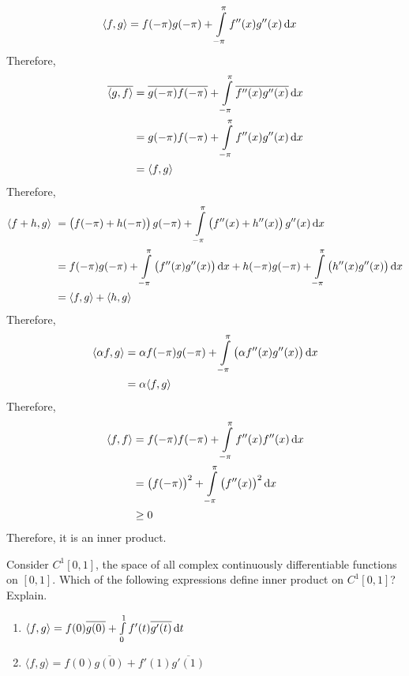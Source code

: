 \documentclass[fleqn, a4paper, 11pt, oneside]{amsart}
\theoremstyle{definition}
\theoremstyle{theorem}
\begin{document}
\begin{solution}
	\begin{align*}
		\langle f,g \rangle & = f(-\pi) g(-\pi) + \int\limits_{-\pi}^{\pi} f''(x) g''(x) \dif x
	\end{align*}
	Therefore,
	\begin{align*}
		\overline{\langle g,f \rangle} & = \overline{g(-\pi) f(-\pi)} + \int\limits_{-\pi}^{\pi} \overline{f''(x) g''(x)} \dif x \\
                                               & = g(-\pi) f(-\pi) + \int\limits_{-\pi}^{\pi} f''(x) g''(x) \dif x                       \\
                                               & = \langle f,g \rangle
	\end{align*}
	Therefore,
	\begin{align*}
		\langle f + h , g \rangle\ & = \left( f(-\pi) + h(-\pi) \right) g(-\pi) + \int\limits_{-\pi}^{\pi} \left( f''(x) + h''(x) \right) g''(x) \dif x                                                    \\
                                           & = f(-\pi) g(-\pi) + \int\limits_{-\pi}^{\pi} \left( f''(x)  g''(x) \right) \dif x + h(-\pi) g(-\pi) + \int\limits_{-\pi}^{\pi} \left( h''(x)  g''(x) \right) \dif x \\
                                           & = \langle f,g \rangle + \langle h,g \rangle
	\end{align*}
	Therefore,
	\begin{align*}
		\langle \alpha f , g \rangle & = \alpha f(-\pi) g(-\pi) + \int\limits_{-\pi}^{\pi} \left( \alpha f''(x)  g''(x) \right) \dif x \\
                                             & = \alpha \langle f,g \rangle
	\end{align*}
	Therefore,
	\begin{align*}
		\langle f,f \rangle & = f(-\pi) f(-\pi) + \int\limits_{-\pi}^{\pi} f''(x) f''(x) \dif x                    \\
                                    & = \left( f(-\pi) \right)^2 + \int\limits_{-\pi}^{\pi} \left( f''(x) \right)^2 \dif x \\
                                    & \ge 0
	\end{align*}
	Therefore, it is an inner product.
\end{solution}

\begin{question}
	Consider $C^1[0,1]$, the space of all complex continuously differentiable functions on $[0,1]$.
	Which of the following expressions define inner product on $C^1[0,1]$?
	Explain.
	\begin{enumerate}
		\item $\langle f,g \rangle = f(0) \overline{g(0)} + \int\limits_{0}^{1} f'(t) \overline{g'(t)} \dif t$
		\item $\langle f,g \rangle = f(0) \overline{g(0)} + f'(1) \overline{g'(1)}$
	\end{enumerate}
\end{question}
\end{document}
